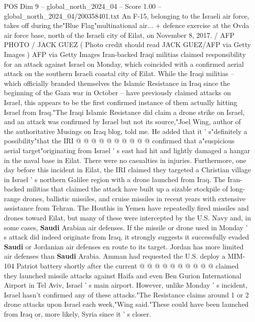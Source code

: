\begin{textsample}{POS Dim 9 – global\_north\_2024\_04 – Score 1.00 – global\_north\_2024\_04/200358401.txt}  \label{ex:f9_pos_183}
An F-15, belonging to the Israeli air force, takes off during the"Blue Flag"multinational air... + defence exercise at the Ovda air force base, north of the Israeli city of Eilat, on November 8, 2017. / AFP PHOTO / JACK GUEZ ( Photo credit should read JACK GUEZ/AFP via Getty Images ) AFP via Getty Images Iran-backed Iraqi militias claimed responsibility for an attack against Israel on Monday, which coincided with a confirmed aerial attack on the southern Israeli coastal city of Eilat.
While the Iraqi militias -- which officially branded themselves the Islamic Resistance in Iraq since the beginning of the Gaza war in October -- have previously claimed attacks on Israel, this appears to be the first confirmed instance of them actually hitting Israel from Iraq."The Iraqi Islamic Resistance did claim a drone strike on Israel, and an attack was confirmed by Israel but not its source,"Joel Wing, author of the authoritative Musings on Iraq blog, told me.
He added that it ' s"definitely a possibility"that the IRI @ @ @ @ @ @ @ @ @ @ confirmed that a"suspicious aerial target"originating from Israel ' s east had hit and lightly damaged a hangar in the naval base in Eilat.
There were no casualties in injuries.
Furthermore, one day before this incident in Eilat, the IRI claimed they targeted a Christian village in Israel ' s northern Galilee region with a drone launched from Iraq.
The Iran-backed militias that claimed the attack have built up a sizable stockpile of long-range drones, ballistic missiles, and cruise missiles in recent years with extensive assistance from Tehran.
The Houthis in Yemen have repeatedly fired missiles and drones toward Eilat, but many of these were intercepted by the U.S.
Navy and, in some cases, \textbf{Saudi} Arabian air defenses.
If the missile or drone used in Monday ' s attack did indeed originate from Iraq, it strongly suggests it successfully evaded \textbf{Saudi} or Jordanian air defenses en route to its target.
Jordan has more limited air defenses than \textbf{Saudi} Arabia.
Amman had requested the U.S. deploy a MIM-104 Patriot battery shortly after the current @ @ @ @ @ @ @ @ @ @ claimed they launched missile attacks against Haifa and even Ben Gurion International Airport in Tel Aviv, Israel ' s main airport.
However, unlike Monday ' s incident, Israel hasn't confirmed any of these attacks."The Resistance claims around 1 or 2 drone attacks upon Israel each week,"Wing said."These could have been launched from Iraq or, more likely, Syria since it ' s closer.

\end{textsample}
